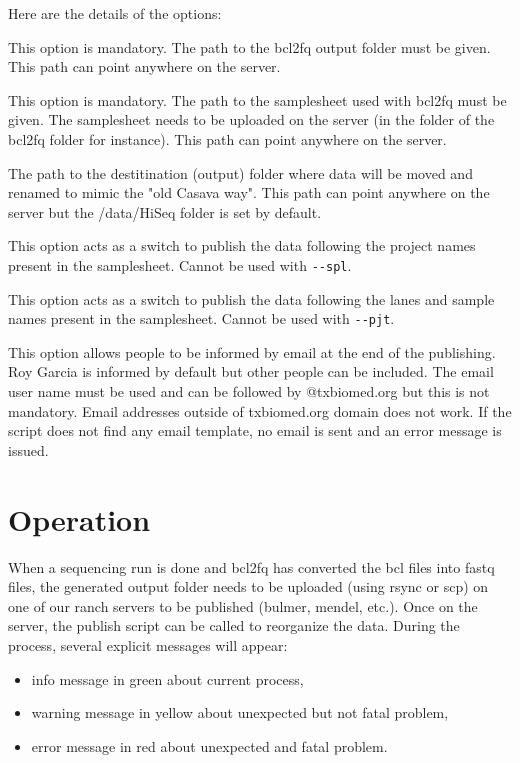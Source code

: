 \documentclass[11pt]{report}
\begin{document}
Here are the details of the options:
\begin{description} [labelindent=2cm]
	\item [\texttt{\textbf{-{}-dir}}:] This option is mandatory. The path to the bcl2fq output folder must be given. This path can point anywhere on the server.
	\item [\texttt{-{}-ss:}] This option is mandatory. The path to the samplesheet used with bcl2fq must be given. The samplesheet needs to be uploaded on the server (in the folder of the bcl2fq folder for instance). This path can point anywhere on the server.
	\item [\texttt{-{}-dest:}] The path to the destitination (output) folder where data will be moved and renamed to mimic the "old Casava way". This path can point anywhere on the server but the /data/HiSeq folder is set by default.
	\item [\texttt{-{}-pjt:}] This option acts as a switch to publish the data following the project names present in the samplesheet. Cannot be used with \texttt{-{}-spl}.
	\item [\texttt{-{}-spl:}] This option acts as a switch to publish the data following the lanes and sample names present in the samplesheet. Cannot be used with \texttt{-{}-pjt}.
	\item [\texttt{-{}-em:}] This option allows people to be informed by email at the end of the publishing. Roy Garcia is informed by default but other people can be included. The email user name must be used and can be followed by @txbiomed.org but this is not mandatory. Email addresses outside of txbiomed.org domain does not work. If the script does not find any email template, no email is sent and an error message is issued. %
\end{description}


 \section{Operation}

When a sequencing run is done and bcl2fq has converted the bcl files into fastq files, the generated output folder needs to be uploaded (using rsync or scp) on one of our ranch servers to be published (bulmer, mendel, etc.). Once on the server, the publish script can be called to reorganize the data. During the process, several explicit messages will appear:
\begin{itemize}
	\item info message in green about current process,
	\item warning message in yellow about unexpected but not fatal problem,
	\item error message in red about unexpected and fatal problem.
\end{itemize}
\end{document}
